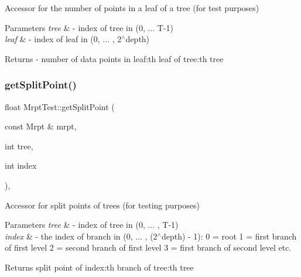 Accessor for the number of points in a leaf of a tree (for test purposes) 
\begin{DoxyParams}{Parameters}
{\em tree} & -\/ index of tree in (0, ... T-\/1) \\
\hline
{\em leaf} & -\/ index of leaf in (0, ... , 2$^\wedge$depth) \\
\hline
\end{DoxyParams}
\begin{DoxyReturn}{Returns}
-\/ number of data points in leaf\+:th leaf of tree\+:th tree 
\end{DoxyReturn}
\mbox{\label{class_mrpt_test_a37d1f6f738de308f759d1969e5027331}} 
\subsubsection{\texorpdfstring{get\+Split\+Point()}{getSplitPoint()}\hspace{0.1cm}{\footnotesize\ttfamily [1/2]}}
{\footnotesize\ttfamily float Mrpt\+Test\+::get\+Split\+Point (\begin{DoxyParamCaption}\item[{const Mrpt \&}]{mrpt,  }\item[{int}]{tree,  }\item[{int}]{index }\end{DoxyParamCaption})\hspace{0.3cm}{\ttfamily [inline]}, {\ttfamily [protected]}}

Accessor for split points of trees (for testing purposes) 
\begin{DoxyParams}{Parameters}
{\em tree} & -\/ index of tree in (0, ... , T-\/1) \\
\hline
{\em index} & -\/ the index of branch in (0, ... , (2$^\wedge$depth) -\/ 1)\+: 0 = root 1 = first branch of first level 2 = second branch of first level 3 = first branch of second level etc. \\
\hline
\end{DoxyParams}
\begin{DoxyReturn}{Returns}
split point of index\+:th branch of tree\+:th tree 
\end{DoxyReturn}
\mbox{\label{class_mrpt_test_a37d1f6f738de308f759d1969e5027331}} 

